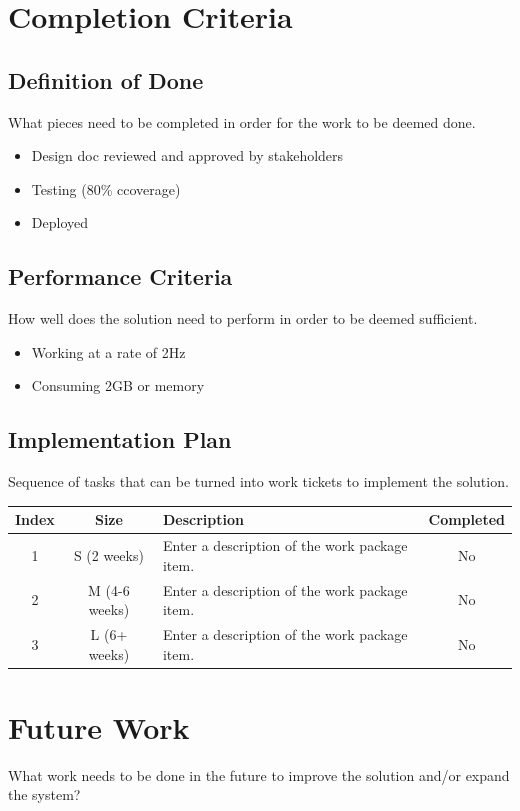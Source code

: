 \documentclass{article}
\begin{document}
\pagebreak
\section{Completion Criteria}

\subsection{Definition of Done}

What pieces need to be completed in order for the work to be deemed done.

\begin{itemize}
    \item Design doc reviewed and approved by stakeholders
    \item Testing (80\% ccoverage)
    \item Deployed
\end{itemize}

\subsection{Performance Criteria}

How well does the solution need to perform in order to be deemed sufficient.

\begin{itemize}
    \item Working at a rate of 2Hz
    \item Consuming 2GB or memory
\end{itemize}

\subsection{Implementation Plan}

Sequence of tasks that can be turned into work tickets to implement the solution.

\vspace{10pt}

\begin{tabularx}{\linewidth}{c|c|L{1}|c}
Index & Size & Description & Completed \\
 & S (2 weeks) & Enter a description of the work package item. & No \\
2 & M (4-6 weeks) & Enter a description of the work package item. & No \\
3 & L (6+ weeks) & Enter a description of the work package item. & No
\end{tabularx}

\pagebreak
\section{Future Work}

What work needs to be done in the future to improve the solution and/or expand the system?
\end{document}
